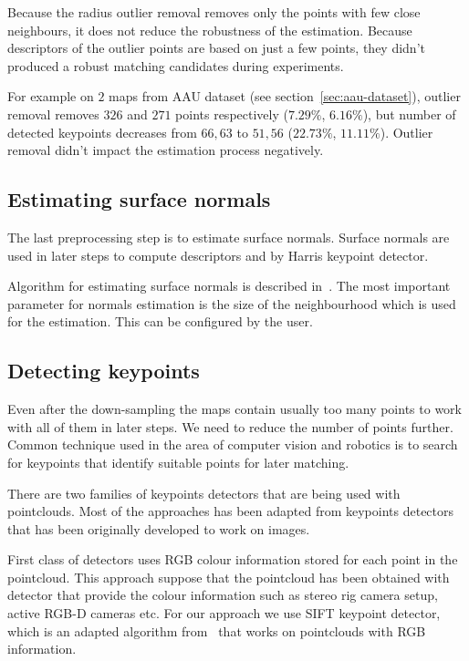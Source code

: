 Because the radius outlier removal removes only the points with few close neighbours, it does not reduce the robustness of the estimation. Because descriptors of the outlier points are based on just a few points, they didn't produced a robust matching candidates during experiments.

For example on $2$ maps from \gls{AAU} dataset (see section~\ref{sec:aau-dataset}), outlier removal removes $326$ and $271$ points respectively ($7.29\%$, $6.16\%$), but number of detected keypoints decreases from $66, 63$ to $51, 56$ ($22.73\%$, $11.11\%$). Outlier removal didn't impact the estimation process negatively.

\subsection{Estimating surface normals}

The last preprocessing step is to estimate surface normals. Surface normals are used in later steps to compute descriptors and by Harris keypoint detector.

Algorithm for estimating surface normals is described in~\cite{RusuDoctoralDissertation}. The most important parameter for normals estimation is the size of the neighbourhood which is used for the estimation. This can be configured by the user.

\subsection{Detecting keypoints}

Even after the down-sampling the maps contain usually too many points to work with all of them in later steps. We need to reduce the number of points further. Common technique used in the area of computer vision and robotics is to search for keypoints that identify suitable points for later matching.

There are two families of keypoints detectors that are being used with pointclouds. Most of the approaches has been adapted from keypoints detectors that has been originally developed to work on images.

First class of detectors uses RGB colour information stored for each point in the pointcloud. This approach suppose that the pointcloud has been obtained with detector that provide the colour information such as stereo rig camera setup, active RGB-D cameras etc. For our approach we use \gls{SIFT} keypoint detector, which is an adapted algorithm from~\cite{lowe2004distinctive} that works on pointclouds with RGB information.

